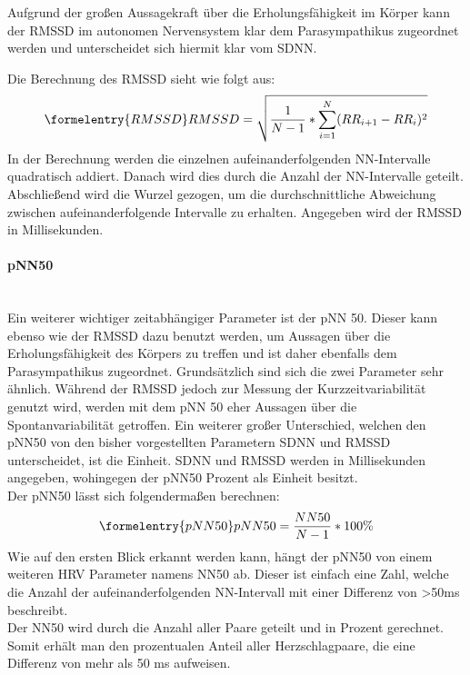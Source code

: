 Aufgrund der großen Aussagekraft über die Erholungsfähigkeit im Körper kann der RMSSD im autonomen Nervensystem klar dem Parasympathikus zugeordnet werden und unterscheidet sich hiermit klar vom SDNN.\cite[S.22]{babilon}

Die Berechnung des RMSSD sieht wie folgt aus:
\begin{equation}\formelentry{RMSSD}
	RMSSD = \sqrt{\dfrac{1}{N-1} * \sum\limits_{i=1}^{N}  (RR_{i+1} - RR_i)^{2}}
\end{equation}
In der Berechnung werden die einzelnen aufeinanderfolgenden NN-Intervalle quadratisch addiert. Danach wird dies durch die Anzahl der NN-Intervalle geteilt. Abschließend wird die Wurzel gezogen, um die durchschnittliche Abweichung zwischen aufeinanderfolgende Intervalle zu erhalten. Angegeben wird der RMSSD in Millisekunden.\cite{rmssdart}\cite{zeit} \\


\paragraph{pNN50}\mbox{} \\
Ein weiterer wichtiger zeitabhängiger Parameter ist der pNN 50. Dieser kann ebenso wie der RMSSD dazu benutzt werden, um Aussagen über die Erholungsfähigkeit des Körpers zu treffen und ist daher ebenfalls dem Parasympathikus zugeordnet. Grundsätzlich sind sich die zwei Parameter sehr ähnlich.
Während der RMSSD jedoch zur Messung der Kurzzeitvariabilität genutzt wird, werden mit dem pNN 50 eher Aussagen über die Spontanvariabilität getroffen. \cite[S.2]{babilon}
Ein weiterer großer Unterschied, welchen den pNN50 von den bisher vorgestellten Parametern SDNN und RMSSD unterscheidet, ist die Einheit. SDNN und RMSSD werden in Millisekunden angegeben, wohingegen der pNN50 Prozent als Einheit besitzt. \\

Der pNN50 lässt sich folgendermaßen berechnen:
\begin{equation}\formelentry{pNN50}
	pNN50 =\dfrac{NN50}{N-1} * 100\%
\end{equation}
Wie auf den ersten Blick erkannt werden kann, hängt der pNN50 von einem weiteren HRV Parameter namens NN50 ab. Dieser ist einfach eine Zahl, welche die Anzahl der aufeinanderfolgenden NN-Intervall mit einer Differenz von >50ms beschreibt.\\
Der NN50 wird durch die Anzahl aller Paare geteilt und in Prozent gerechnet. Somit erhält man den prozentualen Anteil aller Herzschlagpaare, die eine Differenz von mehr als 50 ms aufweisen. \cite{zeit}

